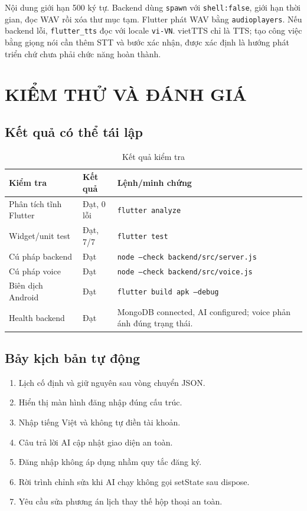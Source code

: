 \documentclass[12pt,a4paper,oneside]{report}
\begin{document}
Nội dung giới hạn 500 ký tự. Backend dùng \texttt{spawn} với \texttt{shell:false},
giới hạn thời gian, đọc WAV rồi xóa thư mục tạm. Flutter phát WAV bằng
\texttt{audioplayers}. Nếu backend lỗi, \texttt{flutter\_tts} đọc với locale
\texttt{vi-VN}. vietTTS chỉ là TTS; tạo công việc bằng giọng nói cần thêm STT và bước
xác nhận, được xác định là hướng phát triển chứ chưa phải chức năng hoàn thành.

\chapter{KIỂM THỬ VÀ ĐÁNH GIÁ}
\section{Kết quả có thể tái lập}
\begin{table}[H]\centering\caption{Kết quả kiểm tra}
\begin{tabularx}{\textwidth}{p{4cm}p{3cm}X}\toprule
\textbf{Kiểm tra}&\textbf{Kết quả}&\textbf{Lệnh/minh chứng}\\\midrule
Phân tích tĩnh Flutter&Đạt, 0 lỗi&\texttt{flutter analyze}\\
Widget/unit test&Đạt, 7/7&\texttt{flutter test}\\
Cú pháp backend&Đạt&\texttt{node --check backend/src/server.js}\\
Cú pháp voice&Đạt&\texttt{node --check backend/src/voice.js}\\
Biên dịch Android&Đạt&\texttt{flutter build apk --debug}\\
Health backend&Đạt&MongoDB connected, AI configured; voice phản ánh đúng trạng thái.\\\bottomrule
\end{tabularx}\end{table}

\section{Bảy kịch bản tự động}
\begin{enumerate}
 \item Lịch cố định và giữ nguyên sau vòng chuyển JSON.
 \item Hiển thị màn hình đăng nhập đúng cấu trúc.
 \item Nhập tiếng Việt và không tự điền tài khoản.
 \item Câu trả lời AI cập nhật giao diện an toàn.
 \item Đăng nhập không áp dụng nhầm quy tắc đăng ký.
 \item Rời trình chỉnh sửa khi AI chạy không gọi setState sau dispose.
 \item Yêu cầu sửa phương án lịch thay thế hộp thoại an toàn.
\end{enumerate}
\end{document}
